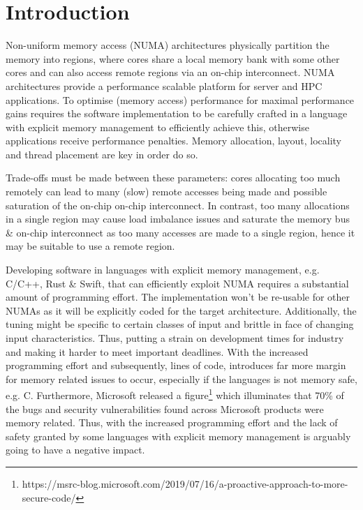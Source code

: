 \documentclass{paper}\usepackage{graphicx}
\begin{document}
\begin{abstract}
\end{abstract}

\section{Introduction}
\label{sec:intro}

Non-uniform memory access (NUMA) architectures physically partition the memory into regions, where cores share a local memory bank with some other cores and can also access remote regions via an on-chip interconnect. NUMA architectures provide a performance scalable platform for server and HPC applications. To optimise (memory access) performance for maximal performance gains requires the software implementation to be carefully crafted in a language with explicit memory management to efficiently achieve this, otherwise applications receive performance penalties. Memory allocation, layout, locality and thread placement are key in order do so.

Trade-offs must be made between these parameters: cores allocating too much remotely can lead to many (slow) remote accesses being made and possible saturation of the on-chip on-chip interconnect. In contrast, too many allocations in a single region may cause load imbalance issues and saturate the memory bus \& on-chip interconnect as too many accesses are made to a single region, hence it may be suitable to use a remote region\cite{DBLP:conf/iwmm/MajoG11}.

Developing software in languages with explicit memory management, e.g. C/C++, Rust \& Swift, that can efficiently exploit NUMA requires a substantial amount of programming effort. The implementation won't be re-usable for other NUMAs as it will be explicitly coded for the target architecture. Additionally, the tuning might be specific to certain classes of input and brittle in face of changing input characteristics. Thus, putting a strain on development times for industry and making it harder to meet important deadlines. With the increased programming effort and subsequently, lines of code, introduces far more margin for memory related issues to occur, especially if the languages is not memory safe, e.g. C\cite{DBLP:conf/asplos/Shapiro06,DBLP:conf/oopsla/Kell17}. Furthermore, Microsoft released a figure\footnote{https://msrc-blog.microsoft.com/2019/07/16/a-proactive-approach-to-more-secure-code/} which illuminates that 70\% of the bugs and security vulnerabilities found across Microsoft products were memory related. Thus, with the increased programming effort and the lack of safety granted by some languages with explicit memory management is arguably going to have a negative impact. 
\end{document}
